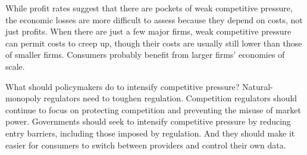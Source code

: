 \begin{overview}
While profit rates suggest that there are pockets of weak competitive pressure, the economic losses are more difficult to assess because they depend on costs, not just profits. When there are just a few major firms, weak competitive pressure can permit costs to creep up, though their costs are usually still lower than those of smaller firms. Consumers probably benefit from larger firms' economies of scale. 

What should policymakers do to intensify competitive pressure? Natural-monopoly regulators need to toughen regulation. Competition regulators should continue to focus on protecting competition and preventing the misuse of market power. Governments should seek to intensify competitive pressure by reducing entry barriers, including those imposed by regulation. And they should make it easier for consumers to switch between providers and control their own data. 
\end{overview}